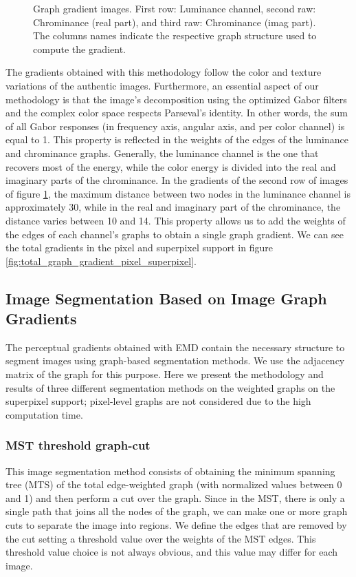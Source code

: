 \documentclass[journal]{IEEEtran}
\begin{document}
\begin{figure}[!ht]
	\caption{Graph gradient images. First row: Luminance channel, second raw: Chrominance (real part), and third raw: Chrominance (imag part). The columns names indicate the respective graph structure used to compute the gradient.}\label{fig:graph_gradient_pixel_superpixel}    
\end{figure}

The gradients obtained with this methodology follow the color and texture variations of the authentic images. Furthermore, an essential aspect of our methodology is that the image's decomposition using the optimized Gabor filters and the complex color space respects Parseval's identity. In other words, the sum of all Gabor responses (in frequency axis, angular axis, and per color channel) is equal to 1. This property is reflected in the weights of the edges of the luminance and chrominance graphs. Generally, the luminance channel is the one that recovers most of the energy, while the color energy is divided into the real and imaginary parts of the chrominance. In the gradients of the second row of images of figure \ref{fig:graph_gradient_pixel_superpixel}, the maximum distance between two nodes in the luminance channel is approximately 30, while in the real and imaginary part of the chrominance, the distance varies between 10 and 14. This property allows us to add the weights of the edges of each channel's graphs to obtain a single graph gradient. We can see the total gradients in the pixel and superpixel support in figure \ref{fig:total_graph_gradient_pixel_superpixel}.

\subsection{Image Segmentation Based on Image Graph Gradients}
The perceptual gradients obtained with EMD contain the necessary structure to segment images using graph-based segmentation methods. We use the adjacency matrix of the graph for this purpose. Here we present the methodology and results of three different segmentation methods on the weighted graphs on the superpixel support; pixel-level graphs are not considered due to the high computation time. 

\subsubsection{MST threshold graph-cut}

This image segmentation method consists of obtaining the minimum spanning tree (MTS) of the total edge-weighted graph (with normalized values between 0 and 1) and then perform a cut over the graph. Since in the MST, there is only a single path that joins all the nodes of the graph, we can make one or more graph cuts to separate the image into regions. We define the edges that are removed by the cut setting a threshold value over the weights of the MST edges. This threshold value choice is not always obvious, and this value may differ for each image.
\end{document}
